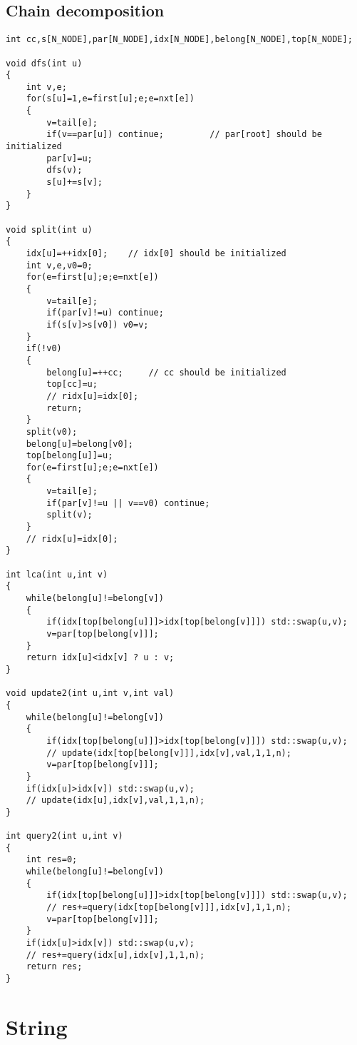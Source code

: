 \documentclass[a4paper,12pt]{article}
\begin{document}
\subsection{Chain decomposition}
\begin{lstlisting}
int cc,s[N_NODE],par[N_NODE],idx[N_NODE],belong[N_NODE],top[N_NODE];

void dfs(int u)
{
    int v,e;
    for(s[u]=1,e=first[u];e;e=nxt[e])
    {
        v=tail[e];
        if(v==par[u]) continue;         // par[root] should be initialized
        par[v]=u;
        dfs(v);
        s[u]+=s[v];
    }
}

void split(int u)
{
    idx[u]=++idx[0];    // idx[0] should be initialized
    int v,e,v0=0;
    for(e=first[u];e;e=nxt[e])
    {
        v=tail[e];
        if(par[v]!=u) continue;
        if(s[v]>s[v0]) v0=v;
    }
    if(!v0)
    {
        belong[u]=++cc;     // cc should be initialized
        top[cc]=u;
        // ridx[u]=idx[0];
        return;
    }
    split(v0);
    belong[u]=belong[v0];
    top[belong[u]]=u;
    for(e=first[u];e;e=nxt[e])
    {
        v=tail[e];
        if(par[v]!=u || v==v0) continue;
        split(v);
    }
    // ridx[u]=idx[0];
}

int lca(int u,int v)
{
    while(belong[u]!=belong[v])
    {
        if(idx[top[belong[u]]]>idx[top[belong[v]]]) std::swap(u,v);
        v=par[top[belong[v]]];
    }
    return idx[u]<idx[v] ? u : v;
}

void update2(int u,int v,int val)
{
    while(belong[u]!=belong[v])
    {
        if(idx[top[belong[u]]]>idx[top[belong[v]]]) std::swap(u,v);
        // update(idx[top[belong[v]]],idx[v],val,1,1,n);
        v=par[top[belong[v]]];
    }
    if(idx[u]>idx[v]) std::swap(u,v);
    // update(idx[u],idx[v],val,1,1,n);
}

int query2(int u,int v)
{
    int res=0;
    while(belong[u]!=belong[v])
    {
        if(idx[top[belong[u]]]>idx[top[belong[v]]]) std::swap(u,v);
        // res+=query(idx[top[belong[v]]],idx[v],1,1,n);
        v=par[top[belong[v]]];
    }
    if(idx[u]>idx[v]) std::swap(u,v);
    // res+=query(idx[u],idx[v],1,1,n);
    return res;
}
\end{lstlisting}


\section{String}
\end{document}
